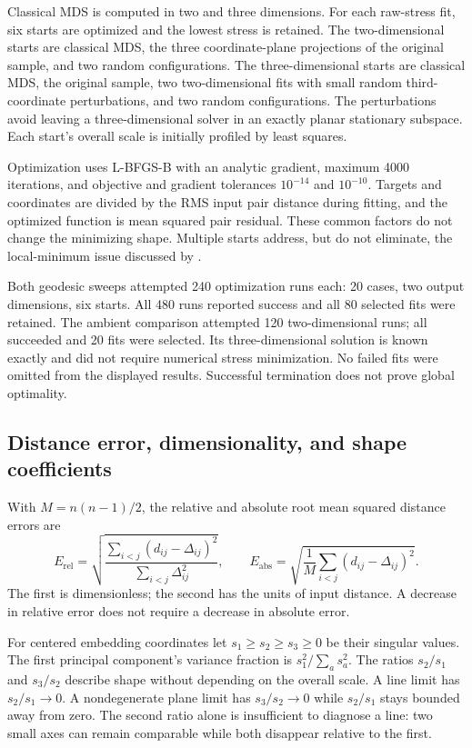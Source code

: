 \documentclass[11pt]{article}
\theoremstyle{remark}\newtheorem{remark}[proposition]{Remark}
\newcommand{\Erel}{E_{\mathrm{rel}}}
\newcommand{\Eabs}{E_{\mathrm{abs}}}
\begin{document}
Classical MDS is computed in two and three dimensions. For each raw-stress fit,
six starts are optimized and the lowest stress is retained. The two-dimensional
starts are classical MDS, the three coordinate-plane projections of the
original sample, and two random configurations. The three-dimensional starts
are classical MDS, the original sample, two two-dimensional fits with small
random third-coordinate perturbations, and two random configurations.
The perturbations avoid leaving a three-dimensional solver in an exactly
planar stationary subspace. Each start's overall scale is initially profiled
by least squares.

Optimization uses L-BFGS-B with an analytic gradient, maximum 4000 iterations,
and objective and gradient tolerances $10^{-14}$ and $10^{-10}$. Targets and
coordinates are divided by the RMS input pair distance during fitting, and
the optimized function is mean squared pair residual. These common factors do
not change the minimizing shape. Multiple starts address, but do not eliminate,
the local-minimum issue discussed by \citet[Section 3.1]{mair2022}.

Both geodesic sweeps attempted 240 optimization runs each: 20 cases, two output
dimensions, six starts. All 480 runs reported success and all 80 selected fits
were retained. The ambient comparison attempted 120 two-dimensional runs;
all succeeded and 20 fits were selected. Its three-dimensional solution is
known exactly and did not require numerical stress minimization. No failed
fits were omitted from the displayed results. Successful termination does
not prove global optimality.

\subsection{Distance error, dimensionality, and shape coefficients}
With $M=n(n-1)/2$, the relative and absolute root mean squared distance errors are
\begin{equation}\label{eq:errors}
 \Erel=\sqrt{\frac{\sum_{i<j}(d_{ij}-\Delta_{ij})^2}
                         {\sum_{i<j}\Delta_{ij}^2}},\qquad
 \Eabs=\sqrt{\frac1M\sum_{i<j}(d_{ij}-\Delta_{ij})^2}.
\end{equation}
The first is dimensionless; the second has the units of input distance. A
decrease in relative error does not require a decrease in absolute error.

For centered embedding coordinates let $s_1\ge s_2\ge s_3\ge0$ be their
singular values. The first principal component's variance fraction is
$s_1^2/\sum_a s_a^2$. The ratios $s_2/s_1$ and $s_3/s_2$ describe shape without
depending on the overall scale. A line limit has $s_2/s_1\to0$. A nondegenerate
plane limit has $s_3/s_2\to0$ while $s_2/s_1$ stays bounded away from zero.
The second ratio alone is insufficient to diagnose a line: two small axes
can remain comparable while both disappear relative to the first.
\end{document}
